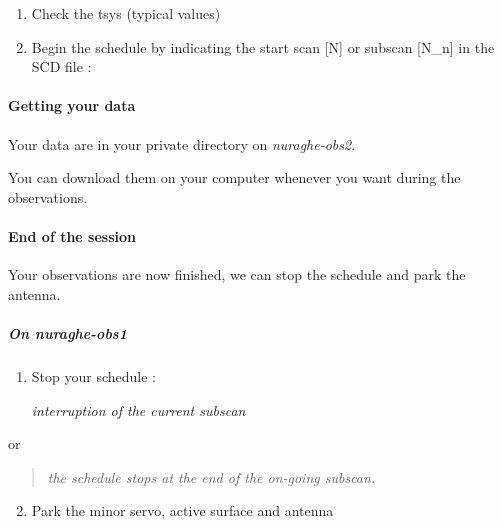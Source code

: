 \documentclass[letterpaper,10pt,english]{sphinxmanual}
\begin{document}
\begin{enumerate}
\item {} 
Check the tsys (typical values)
\begin{quote}

\end{quote}

\item {} 
Begin the schedule by indicating the start scan {[}N{]} or subscan {[}N\_n{]} in the SCD file :
\begin{quote}

\end{quote}

\end{enumerate}


\paragraph{Getting your data}
\label{Continuum/K-band/TP/get-data:getting-your-data}\label{Continuum/K-band/TP/get-data::doc}
Your data are in your private directory on \emph{nuraghe-obs2}.

You can download them on your computer whenever you want during the observations.
\begin{quote}

\end{quote}


\paragraph{End of the session}
\label{Continuum/K-band/TP/stop-session:end-of-the-session}\label{Continuum/K-band/TP/stop-session::doc}
Your observations are now finished, we can stop the schedule and park
the antenna.


\subparagraph{On nuraghe-obs1}
\label{Continuum/K-band/TP/stop-session:on-nuraghe-obs1}\begin{enumerate}
\item {} 
Stop your schedule :

   \emph{interruption of the current subscan}

\end{enumerate}

or
\begin{quote}

    \emph{the schedule stops at the end of the on-going subscan.}
\end{quote}
\begin{enumerate}
\setcounter{enumi}{1}
\item {} 
Park the minor servo, active surface and antenna





\end{enumerate}
\end{document}
